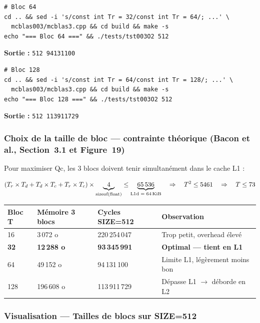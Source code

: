 \documentclass[a4paper,11pt]{article}
\newcommand{\code}[1]{\texttt{\color{CodeRed}#1}}
\begin{document}
\begin{lstlisting}[style=bash]
# Bloc 64
cd .. && sed -i 's/const int Tr = 32/const int Tr = 64/; ...' \
  mcblas003/mcblas3.cpp && cd build && make -s
echo "=== Bloc 64 ===" && ./tests/tst003O2 512
\end{lstlisting}
\textbf{Sortie :} \code{512   94131100}

\begin{lstlisting}[style=bash]
# Bloc 128
cd .. && sed -i 's/const int Tr = 64/const int Tr = 128/; ...' \
  mcblas003/mcblas3.cpp && cd build && make -s
echo "=== Bloc 128 ===" && ./tests/tst003O2 512
\end{lstlisting}
\textbf{Sortie :} \code{512   113911729}

\subsubsection{Choix de la taille de bloc --- contrainte th\'eorique (Bacon et al., Section~3.1 et Figure~19)}

Pour maximiser Qc, les 3 blocs doivent tenir simultan\'ement dans le cache L1 :

\begin{equation}
  (T_r \times T_d + T_d \times T_c + T_r \times T_c) \times \underbrace{4}_{\text{sizeof(float)}} \leq \underbrace{65\,536}_{\text{L1d = 64\,KiB}} \quad \Rightarrow \quad T^2 \leq 5461 \quad \Rightarrow \quad T \leq 73
\end{equation}

\begin{center}
\begin{tabular}{C{2cm}C{3.5cm}R{4cm}L{4.5cm}}
  \toprule
  \textbf{Bloc T} & \textbf{M\'emoire 3 blocs} & \textbf{Cycles SIZE=512} & \textbf{Observation} \\
  \midrule
  16   & 3\,072 o   & 220\,254\,047 & Trop petit, overhead \'elev\'e \\
  \textbf{32} & \textbf{12\,288 o} & \textbf{93\,345\,991} & \textbf{Optimal --- tient en L1} \\
  64   & 49\,152 o  & 94\,131\,100  & Limite L1, l\'eg\`erement moins bon \\
  128  & 196\,608 o & 113\,911\,729 & D\'epasse L1 $\to$ d\'eborde en L2 \\
  \bottomrule
\end{tabular}
\end{center}

\subsubsection{Visualisation  --- Tailles de blocs sur SIZE=512}
\end{document}
